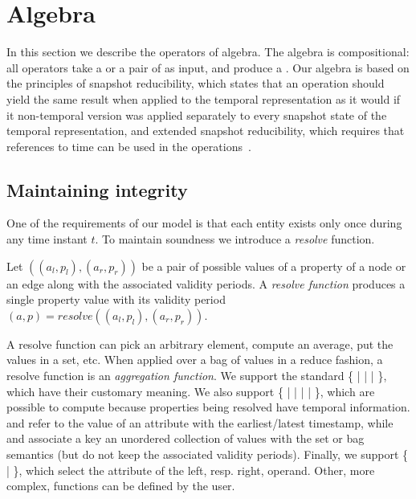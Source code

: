 \section{Algebra}
\label{sec:algebra}
\setlength{\textfloatsep}{5pt}%

In this section we describe the operators of \tg algebra.  The algebra
is compositional: all operators take a \tg or a pair of \tgs as input,
and produce a \tg.  Our algebra is based on the principles of snapshot
reducibility, which states that an operation should yield the same
result when applied to the temporal representation as it would if it
non-temporal version was applied separately to every snapshot state of
the temporal representation, and extended snapshot reducibility, which
requires that references to time can be used in the
operations~\cite{Dignos2012}.


\subsection{Maintaining integrity}
\label{sec:algebra:integrity}

One of the requirements of our model is that each entity exists only
once during any time instant $t$.  To maintain soundness we introduce
a {\em resolve} function.

\begin{definition}
Let $((a_l,p_l),(a_r,p_r))$ be a pair of possible values of a property
of a node or an edge along with the associated validity periods.  A
{\em resolve function} produces a single property value with its
validity period $(a,p) = resolve((a_l,p_l), (a_r,p_r))$.
\end{definition}

A resolve function can pick an arbitrary element, compute an average,
put the values in a set, etc.  When applied over a bag of values in a
reduce fashion, a resolve function is an {\em aggregation function}.
We support the standard \{  |  |  |
 \}, which have their customary meaning.  We also support
\{  |  |  |  |
 \}, which are possible to compute because properties being
resolved have temporal information.   and 
refer to the value of an attribute with the earliest/latest timestamp,
while  and  associate a key an unordered
collection of values with the set or bag semantics (but do not keep
the associated validity periods).  Finally, we support \{ 
|  \}, which select the attribute of the left,
resp. right, operand.  Other, more complex, functions can be defined
by the user.

